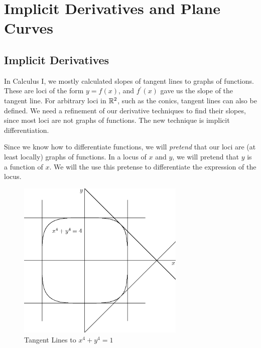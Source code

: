 \documentclass[fleqn]{report}
\begin{document}
\section{Implicit Derivatives and Plane Curves}
\label{plane-curves}

\subsection{Implicit Derivatives}
\label{implicit-derivatives}

In Calculus I, we mostly calculated slopes of tangent lines to
graphs of functions. These are loci of the form $y = f(x)$,
and $f^\prime(x)$ gave us the slope of the tangent line.
For arbitrary loci in $\mathbb{R}^2$, such as the conics, tangent
lines can also be defined. We need a refinement of our
derivative techniques to find their slopes, since most loci
are not graphs of functions. The new technique is implicit
differentiation.

Since we know how to differentiate functions, we will
\emph{pretend} that our loci are (at least locally) graphs of
functions. In a locus of $x$ and $y$, we will pretend that $y$
is a function of $x$. We will the use this pretense to
differentiate the expression of the locus.

\begin{figure}[ht]
\centering
\includegraphics[width=08cm]{figure03.eps}
\caption{Tangent Lines to $x^4 + y^4 =1$}
\label{figure-implicit-example}
\end{figure}
\end{document}

